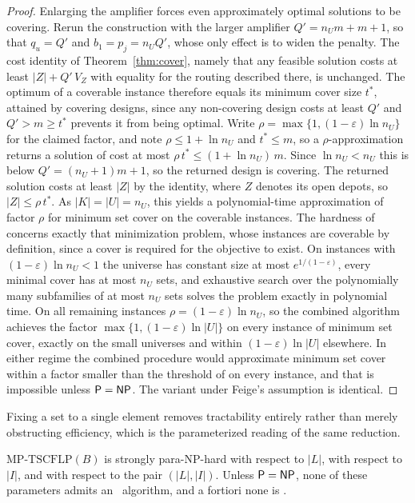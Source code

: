 \begin{proof}
Enlarging the amplifier forces even approximately optimal solutions to
be covering. Rerun the construction with the
larger amplifier $Q'=n_U m+m+1$, so that $q_u=Q'$ and $b_1=p_j=n_UQ'$,
whose only effect is to widen the penalty. The cost identity of
Theorem~\ref{thm:cover}, namely that any feasible solution costs at
least $|Z|+Q'\,V_Z$ with equality for the routing described there, is
unchanged. The optimum of a coverable instance therefore equals its
minimum cover size $t^*$, attained by covering designs, since any
non-covering design costs at least $Q'$ and $Q'>m\ge t^*$ prevents it
from being optimal. Write
$\rho=\max\{1,(1-\varepsilon)\ln n_U\}$ for the claimed factor, and note
$\rho\le 1+\ln n_U$ and $t^*\le m$, so a $\rho$-approximation returns a
solution of cost at most $\rho\,t^*\le(1+\ln n_U)\,m$. Since $\ln n_U<n_U$
this is below $Q'=(n_U+1)m+1$, so the returned design is covering. The
returned solution costs at least $|Z|$ by the identity, where
$Z$ denotes its open depots, so $|Z|\le\rho\,t^*$. As
$|K|=|U|=n_U$, this yields a polynomial-time approximation of factor
$\rho$ for minimum set cover on the coverable instances. The hardness of
\citet{DinurSteurer2014} concerns exactly that minimization problem,
whose instances are coverable by definition, since a cover is required
for the objective to exist. On instances with $(1-\varepsilon)\ln n_U<1$ the
universe has constant size at most $e^{1/(1-\varepsilon)}$, every
minimal cover has at most $n_U$ sets, and exhaustive search over the
polynomially many subfamilies of at most $n_U$ sets solves the problem
exactly in polynomial time. On all remaining instances
$\rho=(1-\varepsilon)\ln n_U$, so the combined algorithm achieves the
factor $\max\{1,(1-\varepsilon)\ln|U|\}$ on every instance of minimum
set cover, exactly on the small universes and within
$(1-\varepsilon)\ln|U|$ elsewhere. In either regime the combined
procedure would approximate minimum set cover within a factor smaller
than the threshold of \citet{DinurSteurer2014} on every instance, and
that is impossible unless $\textsf{P}=\textsf{NP}$. The
variant under Feige's assumption is identical.
\end{proof}

Fixing a set to a single element removes tractability entirely rather
than merely obstructing efficiency, which is the parameterized reading of the
same reduction.

\begin{corollary}\label{cor:coverpara}
$\mathrm{MP\text{-}TSCFLP}(B)$ is strongly para-NP-hard with respect
to $|L|$, with respect to $|I|$, and with respect to the pair
$(|L|,|I|)$. Unless
$\textsf{P}=\textsf{NP}$, none of these parameters admits an \XP\ algorithm, and a
fortiori none is \FPT.
\end{corollary}

